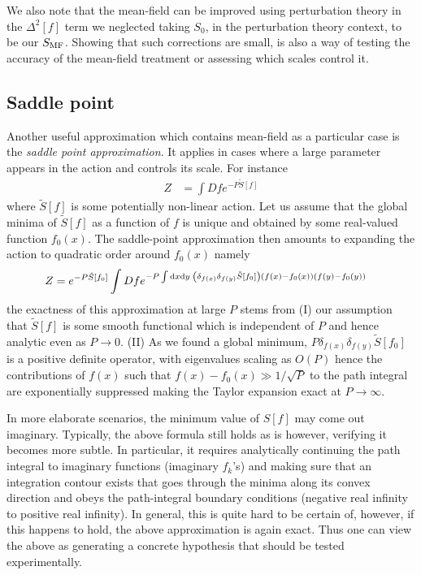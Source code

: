 We also note that the mean-field can be improved using perturbation theory in the $\Delta^2[f]$ term we neglected taking $S_0$, in the perturbation theory context, to be our $S_{\text{MF}}$. Showing that such corrections are small, is also a way of testing the accuracy of the mean-field treatment or assessing which scales control it. 

\subsection{Saddle point}
Another useful approximation which contains mean-field as a particular case is the {\it saddle point approximation}. It applies in cases where a large parameter appears in the action and controls its scale. For instance 
\begin{align}
Z &= \int Df e^{-P \tilde{S}[f]}
\end{align}
where $\tilde{S}[f]$ is some potentially non-linear action. Let us assume that the global minima of $\tilde{S}[f]$ as a function of $f$ is unique and obtained by some real-valued function $f_0(x)$. The saddle-point approximation then amounts to expanding the action to quadratic order around $f_0(x)$ namely  
\begin{align}
Z &= e^{-P\tilde{S}[f_0]} \int Df e^{-P \int \text{d} x \text{d}  y \; \left(\delta_{f(x)} \delta_{f(y)} \tilde{S}[f_0]\right) (f(x)-f_0(x))(f(y)-f_0(y))}
\end{align}
the exactness of this approximation at large $P$ stems from (I) our assumption that $\tilde{S}[f]$ is some smooth functional which is independent of $P$ and hence analytic even as $P\rightarrow 0$. (II) As we found a global minimum, $P\delta_{f(x)} \delta_{f(y)} \tilde{S}[f_0]$ is a positive definite operator, with eigenvalues scaling as $O(P)$ hence the contributions of $f(x)$ such that $f(x)-f_0(x) \gg 1/\sqrt{P}$ to the path integral are exponentially suppressed making the Taylor expansion exact at $P \rightarrow \infty$. 

In more elaborate scenarios, the minimum value of $S[f]$ may come out imaginary. Typically, the above formula still holds as is however, verifying it becomes more subtle. In particular, it requires analytically continuing the path integral to imaginary functions (imaginary $f_k$'s) and making sure that an integration contour exists that goes through the minima along its convex direction and obeys the path-integral boundary conditions (negative real infinity to positive real infinity). In general, this is quite hard to be certain of, however, if this happens to hold, the above approximation is again exact. Thus one can view the above as generating a concrete hypothesis that should be tested experimentally. 

